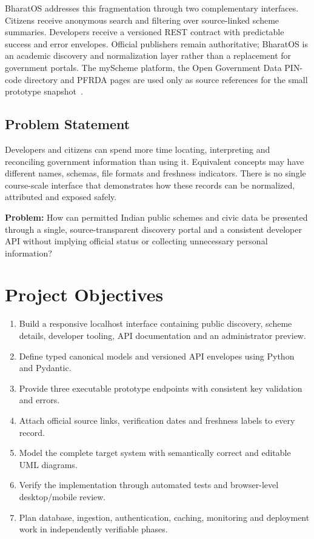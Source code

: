 \documentclass{tietreport}
\begin{document}
BharatOS addresses this fragmentation through two complementary interfaces. Citizens receive
anonymous search and filtering over source-linked scheme summaries. Developers receive a
versioned REST contract with predictable success and error envelopes. Official publishers
remain authoritative; BharatOS is an academic discovery and normalization layer rather than
a replacement for government portals. The myScheme platform, the Open Government Data
PIN-code directory and PFRDA pages are used only as source references for the small prototype
snapshot~\cite{myscheme,ogdpincode,pfrdaapy}.

\subsection{Problem Statement}
Developers and citizens can spend more time locating, interpreting and reconciling government
information than using it. Equivalent concepts may have different names, schemas, file formats
and freshness indicators. There is no single course-scale interface that demonstrates how
these records can be normalized, attributed and exposed safely.

\textbf{Problem:} How can permitted Indian public schemes and civic data be presented through
a single, source-transparent discovery portal and a consistent developer API without implying
official status or collecting unnecessary personal information?

\section{Project Objectives}
\begin{enumerate}
  \item Build a responsive localhost interface containing public discovery, scheme details,
        developer tooling, API documentation and an administrator preview.
  \item Define typed canonical models and versioned API envelopes using Python and Pydantic.
  \item Provide three executable prototype endpoints with consistent key validation and errors.
  \item Attach official source links, verification dates and freshness labels to every record.
  \item Model the complete target system with semantically correct and editable UML diagrams.
  \item Verify the implementation through automated tests and browser-level desktop/mobile review.
  \item Plan database, ingestion, authentication, caching, monitoring and deployment work in
        independently verifiable phases.
\end{enumerate}
\end{document}

